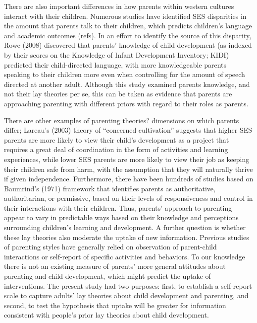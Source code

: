 \documentclass[10pt, letterpaper]{article}
\begin{document}
There are also important differences in how parents within western
cultures interact with their children. Numerous studies have identified
SES disparities in the amount that parents talk to their children, which
predicts children's language and academic outcomes (refs). In an effort
to identify the source of this disparity, Rowe (2008) discovered that
parents' knowledge of child development (as indexed by their scores on
the Knowledge of Infant Development Inventory; KIDI) predicted their
child-directed language, with more knowledgeable parents speaking to
their children more even when controlling for the amount of speech
directed at another adult. Although this study examined parents
knowledge, and not their lay theories per se, this can be taken as
evidence that parents are approaching parenting with different priors
with regard to their roles as parents.

There are other examples of parenting theories? dimensions on which
parents differ; Lareau's (2003) theory of ``concerned cultivation''
suggests that higher SES parents are more likely to view their child's
development as a project that requires a great deal of coordination in
the form of activities and learning experiences, while lower SES parents
are more likely to view their job as keeping their children safe from
harm, with the assumption that they will naturally thrive if given
independence. Furthermore, there have been hundreds of studies based on
Baumrind's (1971) framework that identifies parents as authoritative,
authoritarian, or permissive, based on their levels of responsiveness
and control in their interactions with their children. Thus, parents'
approach to parenting appear to vary in predictable ways based on their
knowledge and perceptions surrounding children's learning and
development. A further question is whether these lay theories also
moderate the uptake of new information. Previous studies of parenting
styles have generally relied on observation of parent-child interactions
or self-report of specific activities and behaviors. To our knowledge
there is not an existing measure of parents' more general attitudes
about parenting and child development, which might predict the uptake of
interventions. The present study had two purposes: first, to establish a
self-report scale to capture adults' lay theories about child
development and parenting, and second, to test the hypothesis that
uptake will be greater for information consistent with people's prior
lay theories about child development.
\end{document}
